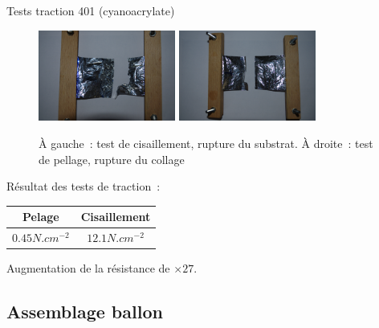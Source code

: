 \begin{frame}{Tests traction 401 (cyanoacrylate)}
  \begin{figure}[!t]
    \centering
    \includegraphics[width=4.5cm]{../Images/test_cisaillement.png}
    \includegraphics[width=4.5cm]{../Images/test_pelage.png}
    
    \caption{À gauche~: test de cisaillement, rupture du substrat. À droite~: test de pellage, rupture du collage}
  \end{figure}
  Résultat des tests de traction~:
  \begin{center}
    \begin{tabular}{|c|c|}
      \hline
      Pelage & Cisaillement \\
      \hline
      $0.45 N.cm^{-2}$ & $12.1 N.cm^{-2}$ \\
      \hline
    \end{tabular}
  \end{center}
  Augmentation de la résistance de $\times 27$.
\end{frame}


\subsection{Assemblage ballon}


